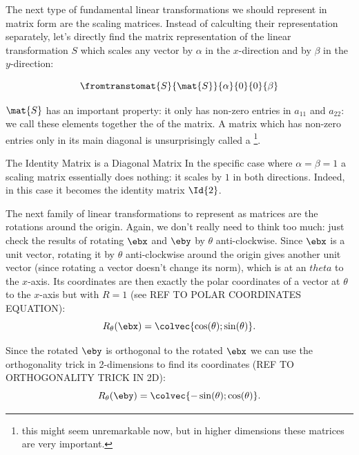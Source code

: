 The next type of fundamental linear transformations we should represent in matrix form are the scaling matrices. Instead of calculting their representation separately, let's directly find the matrix representation of the linear transformation $S$ which scales any vector by $\alpha$ in the $x$-direction and by $\beta$ in the $y$-direction:

\begin{equation}
	\fromtranstomat{S}{\mat{S}}{\alpha}{0}{0}{\beta}
	\label{eq:matrix representation of scaling in R2}
\end{equation}

$\mat{S}$ has an important property: it only has non-zero entries in $a_{11}$ and $a_{22}$: we call these elements together the  of the matrix. A matrix which has non-zero entries only in its main diagonal is unsurprisingly called a \footnote{this might seem unremarkable now, but in higher dimensions these matrices are very important.}.

\begin{note}{The Identity Matrix is a Diagonal Matrix}{}
	In the specific case where $\alpha=\beta=1$ a scaling matrix essentially does nothing: it scales by $1$ in both directions. Indeed, in this case it becomes the identity matrix $\Id{2}$.
\end{note}

The next family of linear transformations to represent as matrices are the rotations around the origin. Again, we don't really need to think too much: just check the results of rotating $\ebx$ and $\eby$ by $\theta$ anti-clockwise. Since $\ebx$ is a unit vector, rotating it by $\theta$ anti-clockwise around the origin gives another unit vector (since rotating a vector doesn't change its norm), which is at an $theta$ to the $x$-axis. Its coordinates are then exactly the polar coordinates of a vector at $\theta$ to the $x$-axis but with $R=1$ (see REF TO POLAR COORDINATES EQUATION):
\begin{equation}
	R_{\theta}(\ebx) = \colvec{\cos(\theta);\sin(\theta)}.
	\label{eq:eb1 rotated by theta}
\end{equation}

Since the rotated $\eby$ is orthogonal to the rotated $\ebx$ we can use the orthogonality trick in 2-dimensions to find its coordinates (REF TO ORTHOGONALITY TRICK IN 2D):
\begin{equation}
	R_{\theta}(\eby) = \colvec{-\sin(\theta);\cos(\theta)}.
	\label{eq:eb2 rotated by theta}
\end{equation}

